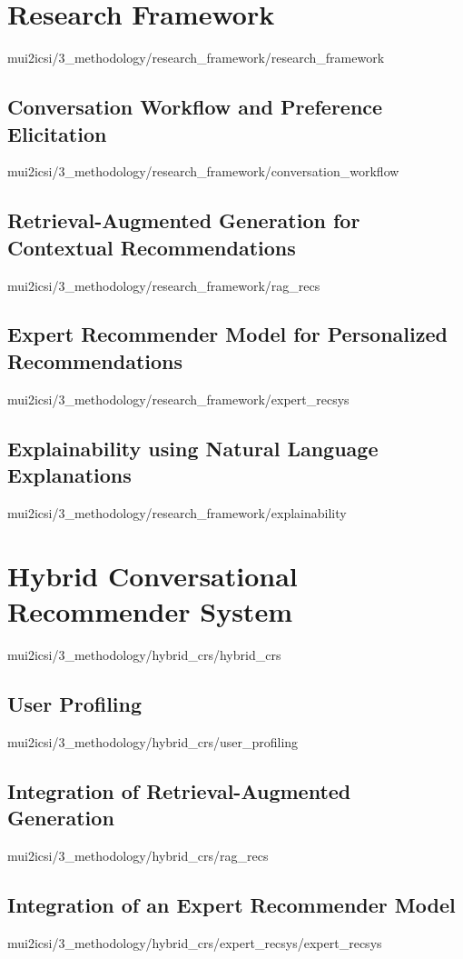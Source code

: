 \documentclass[english,epsbased,copyright,final,printable,covers,extendedindex,firstnumbered,tfm,gnuplot,loc,loe,lof,lot]{tfgtfmthesisuam}
\begin{document}
    \section{Research Framework\label{SEC:RESEARCHFW}}{mui2icsi/3_methodology/research_framework/research_framework}
      \subsection{Conversation Workflow and Preference Elicitation\label{SS:CONVPREF}}{mui2icsi/3_methodology/research_framework/conversation_workflow}
      \subsection{Retrieval-Augmented Generation for Contextual Recommendations\label{SS:RAGRECS}}{mui2icsi/3_methodology/research_framework/rag_recs}
      \subsection{Expert Recommender Model for Personalized Recommendations\label{SS:EXPERTRECSYS}}{mui2icsi/3_methodology/research_framework/expert_recsys}
      \subsection{Explainability using Natural Language Explanations\label{SS:EXPLAINNLE}}{mui2icsi/3_methodology/research_framework/explainability}

    \section{Hybrid Conversational Recommender System\label{SEC:HYBRIDCRS}}{mui2icsi/3_methodology/hybrid_crs/hybrid_crs}
      \subsection{User Profiling\label{SS:USERPROF}}{mui2icsi/3_methodology/hybrid_crs/user_profiling}
      \subsection{Integration of Retrieval-Augmented Generation\label{SS:INTEGRAGRECS}}{mui2icsi/3_methodology/hybrid_crs/rag_recs}
      \subsection{Integration of an Expert Recommender Model\label{SS:INTEGEXPERTRECSYS}}{mui2icsi/3_methodology/hybrid_crs/expert_recsys/expert_recsys}
\end{document}
